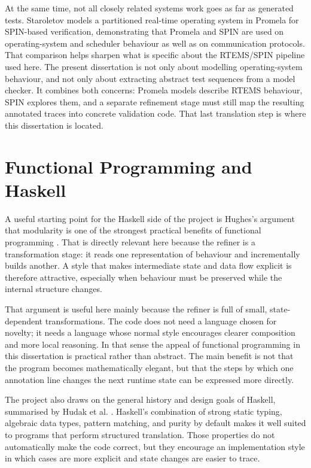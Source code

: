 At the same time, not all closely related systems work goes as far as
generated tests. Staroletov \citep{staroletov2020promela} models a
partitioned real-time operating system in Promela for SPIN-based
verification, demonstrating that Promela and SPIN are used on
operating-system and scheduler behaviour as well as on communication
protocols. That comparison helps sharpen what is specific about the
RTEMS/SPIN pipeline used here. The present dissertation is not only
about modelling operating-system behaviour, and not only about
extracting abstract test sequences from a model checker. It combines
both concerns: Promela models describe RTEMS behaviour, SPIN explores
them, and a separate refinement stage must still map the resulting
annotated traces into concrete validation code. That last translation
step is where this dissertation is located.

\section{Functional Programming and Haskell}


A useful starting point for the Haskell side of the project is
Hughes's argument that modularity is one of the strongest practical
benefits of functional programming \citep{hughes1989why}. That is
directly relevant here because the refiner is a transformation stage:
it reads one representation of behaviour and incrementally builds
another. A style that makes intermediate state and data flow explicit
is therefore attractive, especially when behaviour must be preserved
while the internal structure changes.

That argument is useful here mainly because the refiner is full of
small, state-dependent transformations. The code does not need a
language chosen for novelty; it needs a language whose normal style
encourages clearer composition and more local reasoning. In that sense
the appeal of functional programming in this dissertation is practical
rather than abstract. The main benefit is not that the program
becomes mathematically elegant, but that the steps by which one
annotation line changes the next runtime state can be expressed more
directly.

The project also draws on the general history and design goals of
Haskell, summarised by Hudak et al. \citep{hudak2007history}.
Haskell's combination of strong static typing, algebraic data types,
pattern matching, and purity by default makes it well suited to
programs that perform structured translation. Those properties do not
automatically make the code correct, but they encourage an
implementation style in which cases are more explicit and state
changes are easier to trace.

